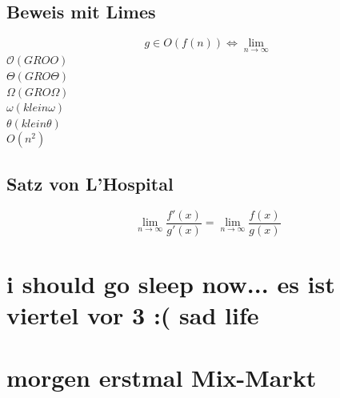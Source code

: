 \documentclass[a4paper,portrait]{scrartcl}
\begin{document}
\subsection{Beweis mit Limes}
$$g \in O(f(n))\Leftrightarrow \lim_{n \to \infty}$$
$\mathcal O(GRO O)$ \\
$\Theta(GRO \Theta)$ \\
$\Omega(GRO \Omega)$ \\
$\omega(klein \omega)$ \\
$\theta(klein \theta)$ \\
$O(n^2)$
\subsection{Satz von L'Hospital}
$$\lim_{n \to \infty} \frac{f'(x)}{g'(x)} = \lim_{n \to \infty} \frac{f(x)}{g(x)}$$
\section{i should go sleep now... es ist viertel vor 3 :( sad life}
\section{morgen erstmal Mix-Markt}
\end{document}

